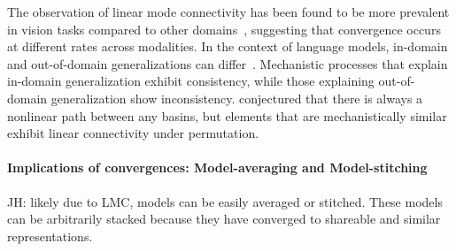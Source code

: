 \documentclass{article}
\newcommand{\jh}[1]{{\;\color{red}JH: #1}}
\theoremstyle{plain}
\theoremstyle{definition}
\theoremstyle{remark}
\begin{document}
The observation of linear mode connectivity has been found to be more prevalent in vision tasks compared to other domains~\cite{wortsman2022model}, suggesting that convergence occurs at different rates across modalities. In the context of language models, in-domain and out-of-domain generalizations can differ~\cite{juneja2022linear}. Mechanistic processes that explain in-domain generalization exhibit consistency, while those explaining out-of-domain generalization show inconsistency.
\cite{lubana2022mechanistic} conjectured that there is always a nonlinear path between any basins, but elements that are mechanistically similar exhibit linear connectivity under permutation.






\paragraph{Implications of convergences: Model-averaging and Model-stitching}
\jh{likely due to LMC, models can be easily averaged or stitched. These models can be arbitrarily stacked because they have converged to shareable and similar representations.}
\end{document}
